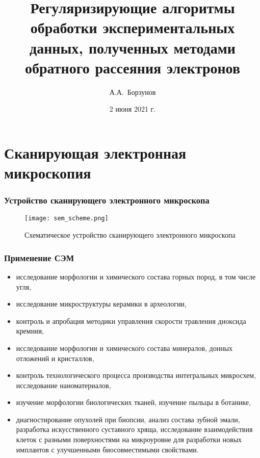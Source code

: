 \documentclass{beamer}
\title[Регуляризирующие алгоритмы в СЭМ]{Регуляризирующие алгоритмы обработки экспериментальных данных,
полученных методами обратного рассеяния электронов}
\author[А.А.~Борзунов]{А.А.~Борзунов\inst{1}}
\institute[МГУ им. М.В. Ломоносова]{Московский Государственный Университет им. М.В. Ломоносова,
физический факультет}
\date{2 июня 2021 г.}
\begin{document}
\begin{frame}
    \titlepage
\end{frame}


\section{Сканирующая электронная микроскопия}
\begin{frame}
    \sectionpage
\end{frame}

\begin{frame}
    \frametitle{Устройство сканирующего электронного микроскопа}
    \begin{figure}
        \texttt{[image: sem\_scheme.png]}
        \caption{Схематическое устройство сканирующего электронного микроскопа}
    \end{figure}
\end{frame}

\begin{frame}
    \frametitle{Применение СЭМ}
    \begin{itemize}
        \item исследование морфологии и химического состава горных
            пород, в том числе угля,

        \item исследование микроструктуры керамики в археологии,

        \item контроль и апробация методики управления скорости травления диоксида
            кремния,

        \item исследование морфологии и химического состава минералов, донных отложений и
            кристаллов,

        \item контроль технологического процесса производства интегральных
            микросхем, исследование наноматериалов,


        \item изучение морфологии биологических тканей, изучение пыльцы в
            ботанике,

        \item диагностирование опухолей при биопсии, анализ состава
            зубной эмали, разработка искусственного суставного
            хряща, исследование взаимодействия клеток с разными
            поверхностями на микроуровне для разработки новых имплантов с улучшенными биосовместимыми
            свойствами.

    \end{itemize}
\end{frame}
\end{document}

